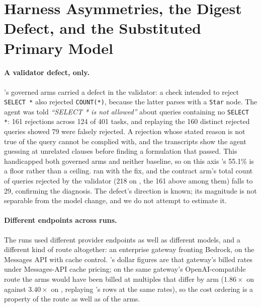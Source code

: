 \section{Harness Asymmetries, the Digest Defect, and the Substituted Primary
Model}
\label{app:harness}

\paragraph{A validator defect, \mGLM{} only.} \mGLM{}'s governed arms
carried a defect in the validator: a check intended to reject
\texttt{SELECT *} also rejected \texttt{COUNT(*)}, because the latter parses
with a \texttt{Star} node. The agent was told \emph{``SELECT * is not
allowed''} about queries containing no \texttt{SELECT *}: 161 rejections
across 124 of 401 tasks, and replaying the 160 distinct rejected queries
showed 79 were falsely rejected. A rejection whose stated reason is not true
of the query cannot be complied with, and the transcripts show the agent
guessing at unrelated clauses before finding a formulation that passed. This
handicapped both governed arms and neither baseline, so on this axis
\mGLM{}'s 55.1\% is a floor rather than a ceiling. \mDS{} ran with the fix,
and the contract arm's total count of queries rejected by the validator (218
on \mGLM{}, the 161 above among them) falls to 29, confirming the diagnosis.
The defect's direction is known; its magnitude is not separable from the
model change, and we do not attempt to estimate it.

\paragraph{Different endpoints across runs.} The runs used different
provider endpoints as well as different models, and \mSON{} a different kind
of route altogether: an enterprise gateway fronting Bedrock, on the Messages
API with cache control. \mSON{}'s dollar figures are that gateway's billed
rates under Messages-API cache pricing; on the same gateway's
OpenAI-compatible route the arms would have been billed at multiples that
differ by arm ($1.86{\times}$ on \armS{} against $3.40{\times}$ on \armM{},
replaying \mGPT{}'s rows at the same rates), so the \mSON{} cost ordering is
a property of the route as well as of the arms.

